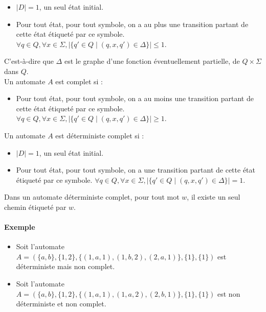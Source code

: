 \begin{itemize}
	\item $\left|D\right| = 1$, un seul état initial.
	\item Pour tout état, pour tout symbole, on a au plus une transition partant de cette état étiqueté par ce symbole. $\forall q \in Q, \forall x \in \Sigma, \left| \{ q' \in Q \mid (q,x,q') \in \Delta \} \right| \leq 1$.
\end{itemize}

C'est-à-dire que $\Delta$ est le graphe d'une fonction éventuellement partielle, de $Q \times \Sigma$ dans $Q$.\\

Un automate $A$ est complet si :

\begin{itemize}
	\item Pour tout état, pour tout symbole, on a au moins une transition partant de cette état étiqueté par ce symbole. $\forall q \in Q, \forall x \in \Sigma, \left| \{ q' \in Q \mid (q,x,q') \in \Delta \} \right| \geq 1$.\\
\end{itemize}

Un automate $A$ est déterministe complet si :

\begin{itemize}
	\item $\left| D \right| = 1$, un seul état initial.
	\item Pour tout état, pour tout symbole, on a une transition partant de cette état étiqueté par ce symbole. $\forall q \in Q, \forall x \in \Sigma, \left| \{ q' \in Q \mid (q,x,q') \in \Delta \} \right| = 1$.\\
\end{itemize}

Dans un automate déterministe complet, pour tout mot $w$, il existe un seul chemin étiqueté par $w$.



\paragraph{Exemple} %
\label{par:exemple}

\begin{itemize}
	\item Soit l'automate $A = (\{a,b\} , \{1,2\} , \{(1,a,1) , (1,b,2) , (2,a,1)\} , \{1\} , \{1\})$ est déterministe mais non complet.
	\item Soit l'automate $A = (\{a,b\} , \{1,2\} , \{(1,a,1) , (1,a,2) , (2,b,1)\} , \{1\} , \{1\})$ est non déterministe et non complet.
\end{itemize}

